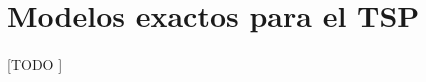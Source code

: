 \documentclass[spanish]{article}
\begin{document}
	\maketitle %

	\thispagestyle{fancy} %



	\begin{abstract}
		\noindent [TODO ]
	\end{abstract}

	\setcounter{section}{8}

	\section{Modelos exactos para el TSP}
	\label{sec:e9}

		\paragraph{}
		[TODO ]


	\nocite{subject:mio}
	\nocite{garciparedes:mosel-examples}
	
  
\end{document}
